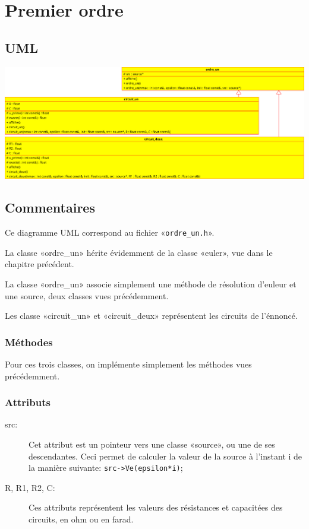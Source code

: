 \documentclass{report}
\begin{document}
\chapter{Premier ordre}
    \begin{multicols}{2}
        \section{UML}
            \includegraphics[width=\linewidth+\linewidth,angle=90]{images/ordre_un}

        \section{Commentaires}
            Ce diagramme UML correspond au fichier «\verb|ordre_un.h|».

            La classe «ordre\_un» hérite évidemment de la classe «euler», vue dans le chapitre précédent.

            La classe «ordre\_un» associe simplement une méthode de résolution d’euleur et une source, deux
            classes vues précédemment.

            Les classe «circuit\_un» et «circuit\_deux» représentent les circuits de l’énnoncé.

            \subsection{Méthodes}
            Pour ces trois classes, on implémente simplement les méthodes vues précédemment.

            \subsection{Attributs}
            \begin{description}
                \item[src:] Cet attribut est un pointeur vers une classe «source», ou une de ses descendantes.
                    Ceci permet de calculer la valeur de la source à l’instant i de la manière suivante:
                    \verb|src->Ve(epsilon*i)|;
                \item[R, R1, R2, C:] Ces attributs représentent les valeurs des résistances et capacitées des
                    circuits, en ohm ou en farad.
            \end{description}

    \end{multicols}
\end{document}
